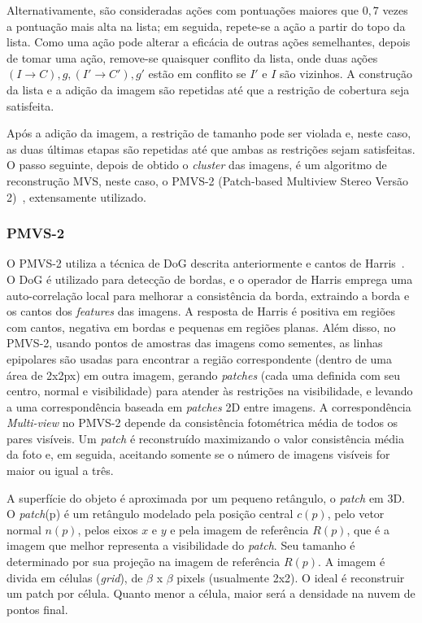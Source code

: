 Alternativamente, são consideradas ações com pontuações maiores que $0,7$ vezes a
pontuação mais alta na lista; em seguida, repete-se a ação a partir do topo da
lista. Como uma ação pode alterar a eficácia de outras ações semelhantes, depois
de tomar uma ação, remove-se quaisquer conflito da lista, onde duas ações ${(I
\rightarrow C), g}, {(I' \rightarrow C'), g' }$ estão em conflito se $I'$ e $I$
são vizinhos. A construção da lista e a adição da imagem são repetidas até que a
restrição de cobertura seja satisfeita.

Após a adição da imagem, a restrição de tamanho pode ser violada e, neste caso,
as duas últimas etapas são repetidas até que ambas as restrições sejam
satisfeitas.
O passo seguinte, depois de obtido o \emph{cluster} das imagens, é um algoritmo
de reconstrução MVS, neste caso, o PMVS-2 (Patch-based Multiview Stereo Versão
2)~\cite{visualSfMPMVS,Li2013,furukawa2010towards}, extensamente utilizado.

\subsubsection*{PMVS-2}

O PMVS-2 utiliza a técnica de DoG descrita anteriormente e cantos de
Harris~\cite{Harris:Stephens:Edge:Corner}. O DoG é utilizado para detecção de
bordas, e o operador de Harris emprega uma auto-correlação local para
melhorar a consistência da borda, extraindo a borda e os cantos dos
\emph{features} das imagens. A resposta de Harris é positiva em regiões com
cantos, negativa em bordas e pequenas em regiões planas. Além disso, no PMVS-2,
usando pontos de amostras das imagens como sementes, as linhas epipolares são
usadas para encontrar a região correspondente (dentro de uma área de 2x2px) em
outra imagem, gerando \emph{patches} (cada uma definida com seu centro, normal e
visibilidade) para atender às restrições na visibilidade, e levando a uma
correspondência baseada em \emph{patches} 2D entre imagens. A correspondência
\emph{Multi-view} no PMVS-2 depende da
consistência fotométrica média de todos os pares visíveis. Um \emph{patch} é
reconstruído maximizando o valor consistência média da foto e, em
seguida, aceitando somente se o número de imagens visíveis for maior ou igual a
três.

A superfície do objeto é aproximada por um pequeno retângulo, o \emph{patch} em
3D.  O \emph{patch}(p) é um retângulo modelado pela posição central $c(p)$, pelo
vetor normal $n(p)$, pelos eixos $x$ e $y$ e pela imagem de referência $R(p)$,
que é a imagem que melhor representa a visibilidade do \emph{patch}. Seu
tamanho é determinado por sua projeção na imagem de referência $R(p)$.
A imagem é divida em células (\emph{grid}), de $\beta$ x $\beta$ pixels
(usualmente 2x2). O ideal é reconstruir um patch por célula. Quanto menor a
célula, maior será a densidade na nuvem de pontos final.

